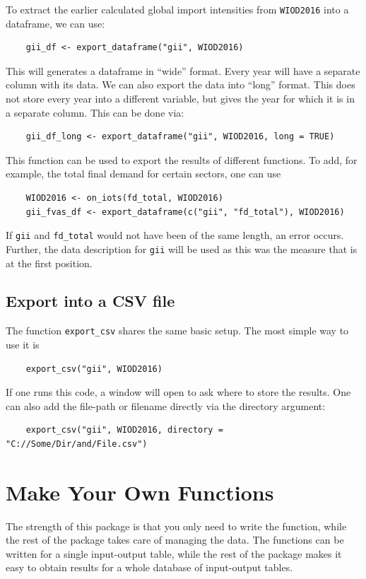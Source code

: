 \documentclass[10pt,a4paper]{paper}
\begin{document}
	To extract the earlier calculated global import intensities from \texttt{WIOD2016} into a dataframe, we can use:
	\begin{Verbatim}
	gii_df <- export_dataframe("gii", WIOD2016)
	\end{Verbatim}
	This will generates a dataframe in ``wide'' format. Every year will have a separate column with its data. We can also export the data into ``long'' format. This does not store every year into a different variable, but gives the year for which it is in a separate column. This can be done via:
	\begin{Verbatim}
	gii_df_long <- export_dataframe("gii", WIOD2016, long = TRUE)
	\end{Verbatim}
	This function can be used to export the results of different functions. To add, for example, the total final demand for certain sectors, one can use
	\begin{Verbatim}
	WIOD2016 <- on_iots(fd_total, WIOD2016)
	gii_fvas_df <- export_dataframe(c("gii", "fd_total"), WIOD2016)
	\end{Verbatim}
		
	If \texttt{gii} and \texttt{fd\_total} would not have been of the same length, an error occurs. Further, the data description for \texttt{gii} will be used as this was the measure that is at the first position.
	
	\subsection{Export into a CSV file}
	The function \texttt{export\_csv} shares the same basic setup. The most simple way to use it is
	\begin{Verbatim}
	export_csv("gii", WIOD2016)
	\end{Verbatim}
	If one runs this code, a window will open to ask where to store the results. One can also add the file-path or filename directly via the directory argument:
	\begin{Verbatim}
	export_csv("gii", WIOD2016, directory = "C://Some/Dir/and/File.csv")
	\end{Verbatim}
	\section{Make Your Own Functions}
	\label{sec:ownfunction}
	The strength of this package is that you only need to write the function, while the rest of the package takes care of managing the data. The functions can be written for a single input-output table, while the rest of the package makes it easy to obtain results for a whole database of input-output tables.
	
\end{document}
